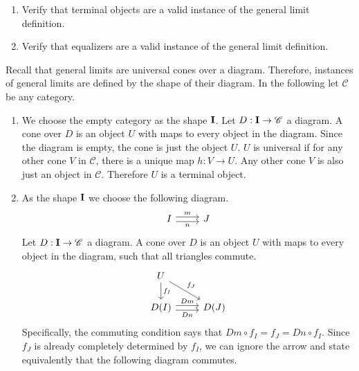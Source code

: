 \def\pathToRoot{../../}

\usepackage{upgreek}



\author{Leonhard Staut}

\begin{exercise}
  \begin{enumerate}
  \item Verify that terminal objects are a valid instance of the general limit definition.
  \item Verify that equalizers are a valid instance of the general limit definition.
  \end{enumerate}
\end{exercise}
\begin{answer}
  Recall that general limits are universal cones over a diagram.
  Therefore, instances of general limits are defined by the shape of their diagram.
  In the following let $\mathscr{C}$ be any category.
  \begin{enumerate}
  \item
    We choose the empty category as the shape $\bf{I}$.
    Let $D : \bf{I} \to \mathscr{C}$ a diagram. A cone over $D$ is an object $U$ with
    maps to every object in the diagram. Since the diagram is empty, the cone is just
    the object $U$.
    $U$ is universal if for any other cone $V$ in $\mathscr{C}$, there is a unique map
    $h : V \to U$.
    Any other cone $V$ is also just an object in $\mathscr{C}$.
    Therefore $U$ is a terminal object.
  \item
    As the shape $\bf{I}$ we choose the following diagram.
    \[
      \begin{tikzcd}
        I \arrow[r,shift left, "m"] \arrow[r,shift right,swap,"n"] & J
      \end{tikzcd}
    \]
    Let $D : \bf{I} \to \mathscr{C}$ a diagram.
    A cone over $D$ is an object $U$ with maps to every object in the diagram, such that all triangles commute.
    \[
      \begin{tikzcd}
        U \arrow{d}{f_I} \arrow{dr}{f_J} & \\
        D(I) \arrow[r,shift left, "Dm"] \arrow[r,shift right,swap,"Dn"] & D(J)
      \end{tikzcd}
    \]
    Specifically, the commuting condition says that $Dm \circ f_I = f_J = Dn \circ f_I$.
    Since $f_J$ is already completely determined by $f_I$, we can ignore the arrow
    and state equivalently that the following diagram commutes.

\end{enumerate}
\end{answer}
